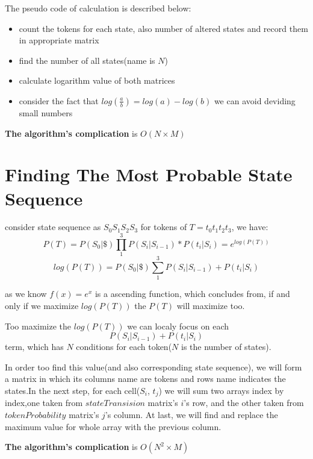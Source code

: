 \documentclass[]{article}
\begin{document}
  The pseudo code of calculation is described below:

  \begin{itemize}
    \item
      count the tokens for each state, also number of altered states and
      record them in appropriate matrix
    \item
      find the number of all states(name is \(N\))
    \item
      calculate logarithm value of both matrices
    \item
      consider the fact that \(log(\frac{a}{b})=log(a)-log(b)\) we can avoid
      deviding small numbers
  \end{itemize}

  \textbf{The algorithm's complication} is \(O ( N\times M)\)

  \section{Finding The Most Probable State
  Sequence}\label{finding-the-most-probable-state-sequence}

  consider state sequence as \(S_0S_1S_2S_3\) for tokens of
  \(T=t_0t_1t_2t_3\), we have: \[
  P( T) =P( S_{0} |\$)\prod ^{3}_{1} P( S_{i} |S_{i-1}) * P( t_{i} |S_{i}) =e^{log( P( T))}
  \] \[
  log( P( T)) =P( S_{0} |\$)\sum ^{3}_{1} P( S_{i} |S_{i-1}) +P( t_{i} |S_{i})
  \]

  as we know \(f(x)=e^x\) is a ascending function, which concludes from,
  if and only if we maximize \(log(P(T))\) the \(P(T)\) will maximize too.

  Too maximize the \(log(P(T))\) we can localy focus on each \[
  P( S_{i} |S_{i-1}) +P( t_{i} |S_{i})
  \] term, which has \(N\) conditions for each token(\(N\) is the number
  of states).

  In order too find this value(and also corresponding state sequence), we
  will form a matrix in which its columns name are tokens and rows name
  indicates the states.In the next step, for each cell(\(S_i\), \(t_j\))
  we will sum two arrays index by index,one taken from \(stateTransision\)
  matrix's \(i\)'s row, and the other taken from \(tokenProbability\)
  matrix's \(j\)'s column. At last, we will find and replace the maximum
  value for whole array with the previous column.

  \textbf{The algorithm's complication} is \(O ( N^2\times M)\)
\end{document}
